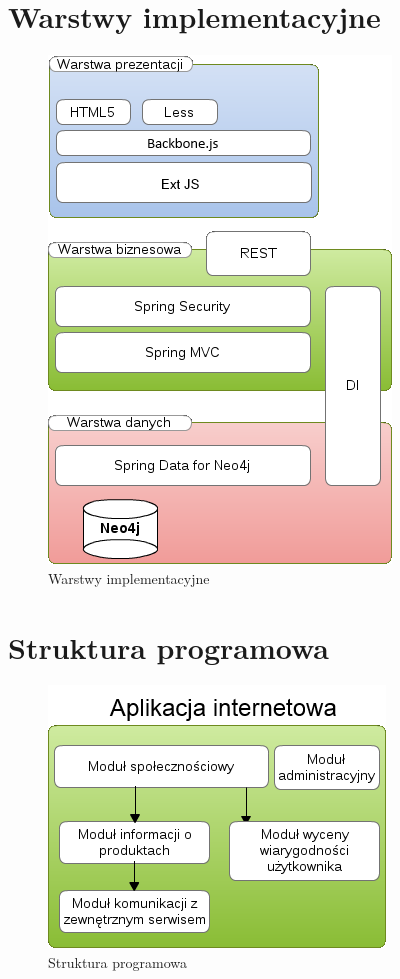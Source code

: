 \section{Warstwy implementacyjne}
\begin{figure}[h!]
	\centering
	\includegraphics[scale=0.9]{images/warstwy.png}
	\caption{Warstwy implementacyjne}
\end{figure}

\section{Struktura programowa}
\begin{figure}[h!]
	\centering
	\includegraphics[scale=0.9]{images/modules.png}
	\caption{Struktura programowa}
\end{figure}

